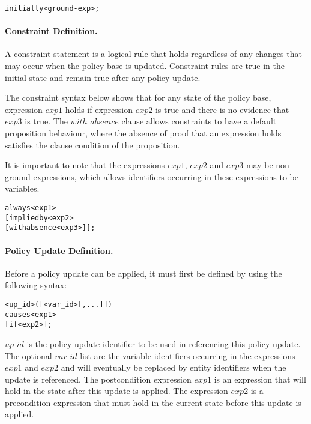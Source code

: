 \documentclass[global,twocolumn,draft]{svjour}
\newenvironment{vverbatim}
  {\begin{alltt}}
  {\vspace{-\baselineskip}\end{alltt}}
\begin{document}
          \begin{vverbatim}
  initially <ground-exp>;
          \end{vverbatim}

        \paragraph{Constraint Definition.}

          A constraint statement is a logical rule that holds regardless of any
          changes that may occur when the policy base is updated. Constraint
          rules are true in the initial state and remain true after any policy
          update.

          The constraint syntax below shows that for any state of the policy
          base, expression $exp1$ holds if expression $exp2$ is true and there
          is no evidence that $exp3$ is true. The $with$ $absence$ clause
          allows constraints to have a default proposition behaviour, where
          the absence of proof that an expression holds  satisfies the clause
          condition of the proposition.

          It is important to note that the expressions $exp1$, $exp2$ and
          $exp3$ may be non-ground expressions, which allows identifiers
          occurring in these expressions to be variables.

          \begin{vverbatim}
  always <exp1>
    [implied by <exp2>
    [with absence <exp3>]];
          \end{vverbatim}

        \paragraph{Policy Update Definition.}

          Before a policy update can be applied, it must first be defined by
          using the following syntax:

          \begin{vverbatim}
  <up\_id>([<var\_id>[, ...]])
    causes <exp1>
    [if <exp2>];
          \end{vverbatim}

          $up\_id$ is the policy update identifier to be used in referencing
          this policy update. The optional $var\_id$ list are the variable
          identifiers occurring in the expressions $exp1$ and $exp2$ and will
          eventually be replaced by entity identifiers when the update is
          referenced. The postcondition expression $exp1$ is an expression that
          will hold in the state after this update is applied. The expression
          $exp2$ is a precondition expression that must hold in the current
          state before this update is applied.
\end{document}
